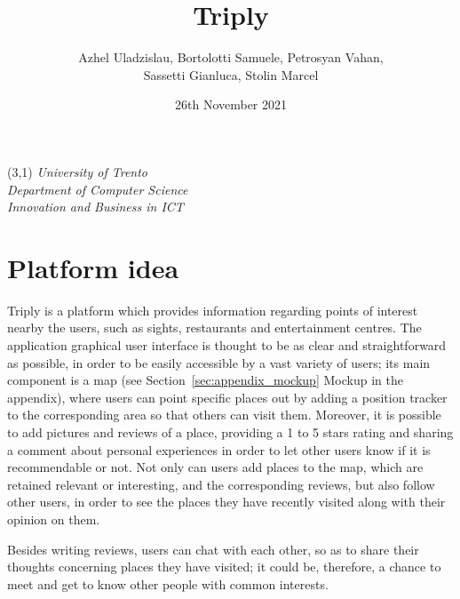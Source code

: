 \documentclass[letterpaper, 11pt]{Proposal}
\title{\vspace{-0.5cm}\hspace{-1.5cm}Triply} %
\author{Azhel Uladzislau, Bortolotti Samuele, Petrosyan Vahan, \\Sassetti Gianluca, Stolin Marcel}
\date{26th November 2021}
\def\Sec#1{Section~\ref{#1}}
\begin{document}
\vspace{-10cm}

\begin{textblock}{10}(3,1)
\textit{University of Trento}\\
\textit{Department of Computer Science}\\
\textit{Innovation and Business in ICT}
\end{textblock}

\maketitle



\vspace{-2cm}

\section{Platform idea}\label{sec:platform-idea}
Triply is a platform which provides information regarding points of interest nearby the users, such as sights, restaurants and entertainment centres.
The application graphical user interface is thought to be as clear and straightforward as possible, in order to be easily accessible by a vast variety of users; its main component is a map (see \Sec{sec:appendix_mockup} Mockup in the appendix), where users can point specific places out by adding a position tracker to the corresponding area so that others can visit them. Moreover, it is possible to add pictures and reviews of a place, providing a 1 to 5 stars rating and sharing a comment about personal experiences in order to let other users know if it is recommendable or not. Not only can users add places to the map, which are retained relevant or interesting, and the corresponding reviews, but also follow other users, in order to see the places they have recently visited along with their opinion on them. 

Besides writing reviews, users can chat with each other, so as to share their thoughts concerning places they have visited; it could be, therefore, a chance to meet and get to know other people with common interests. 
\end{document}
